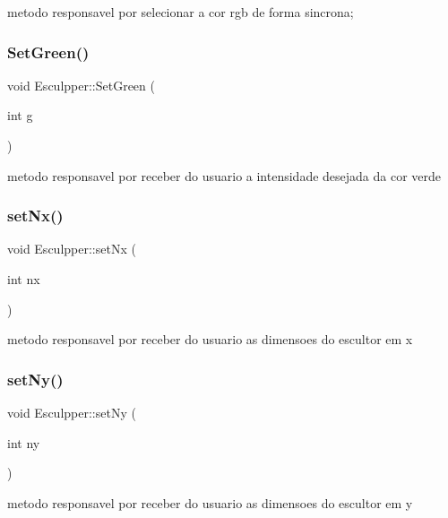 metodo responsavel por selecionar a cor rgb de forma sincrona; \mbox{\label{class_esculpper_a94760e2f4d66bd1001a66cf40fcbfe34}} 
\subsubsection{\texorpdfstring{SetGreen()}{SetGreen()}}
{\footnotesize\ttfamily void Esculpper\+::\+Set\+Green (\begin{DoxyParamCaption}\item[{int}]{g }\end{DoxyParamCaption})}

metodo responsavel por receber do usuario a intensidade desejada da cor verde \mbox{\label{class_esculpper_a9a6e875cc60b1712b468ae500d95abd0}} 
\subsubsection{\texorpdfstring{setNx()}{setNx()}}
{\footnotesize\ttfamily void Esculpper\+::set\+Nx (\begin{DoxyParamCaption}\item[{int}]{nx }\end{DoxyParamCaption})}

metodo responsavel por receber do usuario as dimensoes do escultor em x \mbox{\label{class_esculpper_ab26afe21f9a86beca089a9ba2feda6fc}} 
\subsubsection{\texorpdfstring{setNy()}{setNy()}}
{\footnotesize\ttfamily void Esculpper\+::set\+Ny (\begin{DoxyParamCaption}\item[{int}]{ny }\end{DoxyParamCaption})}

metodo responsavel por receber do usuario as dimensoes do escultor em y \mbox{\label{class_esculpper_a85deaa290e0a2b9e0e143c235252b1de}} 
